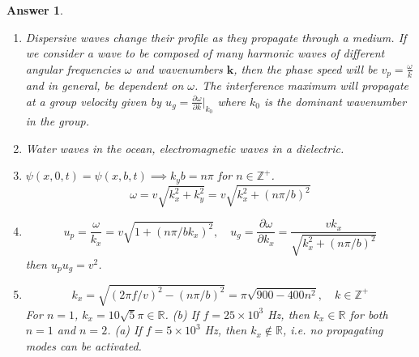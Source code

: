 \documentclass[a4paper]{article}
\newtheorem{ans}{Answer}[subsection]
\theoremstyle{new}
\begin{document}
\begin{ans}\leavevmode
\begin{enumerate}[label=(\roman*)]
\item Dispersive waves change their profile as they propagate through a medium. If we consider a wave to be composed of many harmonic waves of different angular frequencies $\omega$ and wavenumbers $\mathbf{k}$, then the phase speed will be $v_p=\frac{\omega}{k}$ and in general, be dependent on $\omega$. The interference maximum will propagate at a group velocity given by $u_g=\frac{\partial\omega}{\partial k}|_{k_0}$ where $k_0$ is the dominant wavenumber in the group.
\item Water waves in the ocean, electromagnetic waves in a dielectric.
\item $\psi(x,0,t)=\psi(x,b,t)\implies k_yb=n\pi$ for $n\in\mathbb{Z}^+$. $$\omega=v\sqrt{k_x^2+k_y^2}=v\sqrt{k_x^2+(n\pi/b)^2}$$
\item $$u_p=\frac{\omega}{k_x}=v\sqrt{1+(n\pi/bk_x)^2},\quad u_g=\frac{\partial\omega}{\partial k_x}=\frac{vk_x}{\sqrt{k_x^2+(n\pi/b)^2}}$$ then $u_pu_g=v^2$.
\item 
$$k_x=\sqrt{(2\pi f/v)^2-(n\pi/b)^2}=\pi\sqrt{900-400 n^2},\quad k\in\mathbb{Z}^+$$ 
For $n=1$, $k_x=10\sqrt{5}\pi\in\mathbb{R}$. (b) If $f=25\times10^3$ Hz, then $k_x\in\mathbb{R}$ for both $n=1$ and $n=2$. (a) If $f=5\times10^3$ Hz, then $k_x\notin\mathbb{R}$, i.e. no propagating modes can be activated. 
\end{enumerate}
\end{ans}
\newpage
\end{document}
